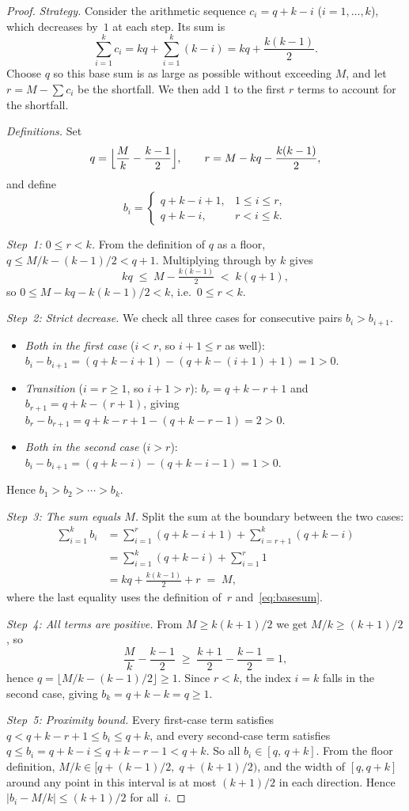 ﻿\documentclass[11pt,a4paper]{article}
\theoremstyle{plain}
\theoremstyle{definition}
\theoremstyle{remark}
\begin{document}
\begin{proof}
\textit{Strategy.}  Consider the arithmetic sequence $c_i=q+k-i$
($i=1,\ldots,k$), which decreases by~$1$ at each step.  Its sum is
\begin{equation}\label{eq:basesum}
  \sum_{i=1}^{k}c_i
  = kq + \sum_{i=1}^{k}(k-i)
  = kq + \frac{k(k-1)}{2}.
\end{equation}
Choose $q$ so this base sum is as large as possible without exceeding
$M$, and let $r=M-\sum c_i$ be the shortfall.  We then add $1$ to the
first $r$ terms to account for the shortfall.

\textit{Definitions.}  Set
\[
  q = \Bigl\lfloor \frac{M}{k} - \frac{k-1}{2} \Bigr\rfloor,
  \qquad
  r = M - kq - \frac{k(k-1)}{2},
\]
and define
\[
  b_i=\begin{cases}q+k-i+1,&1\le i\le r,\\q+k-i,&r<i\le k.\end{cases}
\]

\textit{Step~1: $0\le r<k$.}
From the definition of $q$ as a floor, $q\le M/k-(k-1)/2<q+1$.
Multiplying through by $k$ gives
\[
  kq \;\le\; M - \tfrac{k(k-1)}{2} \;<\; k(q+1),
\]
so $0\le M-kq-k(k-1)/2<k$, i.e.\ $0\le r<k$.

\textit{Step~2: Strict decrease.}
We check all three cases for consecutive pairs $b_i>b_{i+1}$.
\begin{itemize}[nosep]
  \item \textit{Both in the first case} ($i<r$, so $i+1\le r$ as well):
    $b_i-b_{i+1}=(q+k-i+1)-(q+k-(i+1)+1)=1>0$.
  \item \textit{Transition} ($i=r\ge1$, so $i+1>r$):
    $b_r=q+k-r+1$ and $b_{r+1}=q+k-(r+1)$,
    giving $b_r-b_{r+1}=q+k-r+1-(q+k-r-1)=2>0$.
  \item \textit{Both in the second case} ($i>r$):
    $b_i-b_{i+1}=(q+k-i)-(q+k-i-1)=1>0$.
\end{itemize}
Hence $b_1>b_2>\cdots>b_k$.

\textit{Step~3: The sum equals $M$.}
Split the sum at the boundary between the two cases:
\begin{align*}
  \sum_{i=1}^{k}b_i
  &= \sum_{i=1}^{r}(q+k-i+1) + \sum_{i=r+1}^{k}(q+k-i) \\
  &= \sum_{i=1}^{k}(q+k-i) + \sum_{i=1}^{r}1 \\
  &= kq + \frac{k(k-1)}{2} + r \;=\; M,
\end{align*}
where the last equality uses the definition of~$r$ and~\eqref{eq:basesum}.

\textit{Step~4: All terms are positive.}
From $M\ge k(k+1)/2$ we get $M/k\ge(k+1)/2$, so
\[
  \frac{M}{k}-\frac{k-1}{2}\;\ge\;\frac{k+1}{2}-\frac{k-1}{2}=1,
\]
hence $q=\lfloor M/k-(k-1)/2\rfloor\ge1$.
Since $r<k$, the index $i=k$ falls in the second case, giving
$b_k=q+k-k=q\ge1$.

\textit{Step~5: Proximity bound.}
Every first-case term satisfies $q < q+k-r+1\le b_i\le q+k$, and
every second-case term satisfies $q\le b_i=q+k-i\le q+k-r-1<q+k$.
So all $b_i\in[q,\,q+k]$.
From the floor definition, $M/k\in[q+(k-1)/2,\;q+(k+1)/2)$,
and the width of $[q,q+k]$ around any point in this interval is at most
$(k+1)/2$ in each direction.
Hence $|b_i-M/k|\le(k+1)/2$ for all~$i$.
\end{proof}
\end{document}
